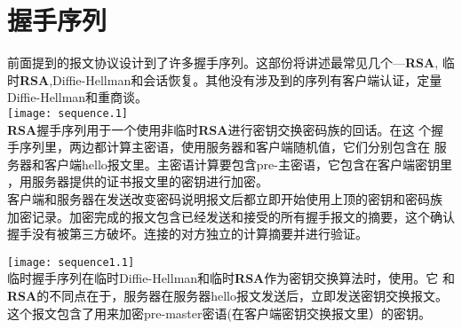 \documentclass[11pt]{article}
\newcommand{\bfs}[1]{{\bf{#1}}}
\begin{document}
\section{握手序列}

前面提到的报文协议设计到了许多握手序列。这部份将讲述最常见几个---\bfs{RSA},
临时\bfs{RSA},Diffie-Hellman和会话恢复。其他没有涉及到的序列有客户端认证，定量Diffie-Hellman和重商谈。\\

%
%
% 
% 
%
%
%
%
%
\texttt{[image: sequence.1]}
\\

  
                
\bfs{RSA}握手序列用于一个使用非临时\bfs{RSA}进行密钥交换密码族的回话。在这
个握手序列里，两边都计算主密语，使用服务器和客户端随机值，它们分别包含在
服务器和客户端hello报文里。主密语计算要包含pre-主密语，它包含在客户端密钥里
，用服务器提供的证书报文里的密钥进行加密。\\

客户端和服务器在发送改变密码说明报文后都立即开始使用上顶的密钥和密码族
加密记录。加密完成的报文包含已经发送和接受的所有握手报文的摘要，这个确认
握手没有被第三方破坏。连接的对方独立的计算摘要并进行验证。


\texttt{[image: sequence1.1]}
\\


临时握手序列在临时Diffie-Hellman和临时\bfs{RSA}作为密钥交换算法时，使用。它
和\bfs{RSA}的不同点在于，服务器在服务器hello报文发送后，立即发送密钥交换报文。
这个报文包含了用来加密pre-master密语(在客户端密钥交换报文里）的密钥。\\
\end{document}
